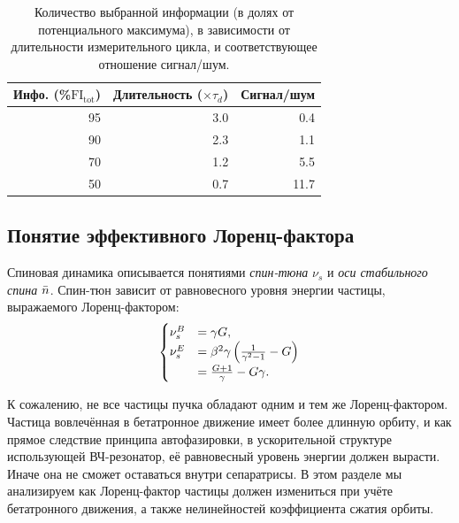 \begin{table}[h]
	\caption{Количество выбранной информации (в долях от потенциального максимума), в зависимости от длительности измерительного цикла, и соответствующее отношение сигнал/шум.\label{tbl:FItot}}
	
	\centering
	\begin{tabular}{rrr}
		\toprule
		Инфо. (\%$\mathrm{FI_{tot}}$) & Длительность ($\times\tau_d$) & Сигнал/шум  \\
		\midrule
		95            & 3.0                     & 0.4         \\
		90            & 2.3                     & 1.1         \\
		70            & 1.2                     & 5.5         \\
		50            & 0.7                     & 11.7        \\
		\bottomrule
	\end{tabular}
\end{table}


\subsection{Понятие эффективного Лоренц-фактора}\label{chpt1:FS-methods:effective-Lorentz-factor}
Спиновая динамика описывается понятиями \emph{спин-тюна} $\nu_s$ и \emph{оси стабильного спина} $\bar n$.
Спин-тюн зависит от равновесного уровня энергии частицы, выражаемого Лоренц-фактором:
\begin{equation}\label{eq:spin_tune_vs_gamma}
\begin{cases}
\nu_s^B &= \gamma G, \\
\nu_s^E &= \beta^2\gamma\bkt{\frac{1}{\gamma^2-1} - G} \\
&= \frac{G+1}{\gamma} - G\gamma.
\end{cases}
\end{equation}

К сожалению, не все частицы пучка обладают одним и тем же Лоренц-фактором. Частица вовлечённая в 
бетатронное движение имеет более длинную орбиту, и как прямое следствие принципа автофазировки,
в ускорительной структуре использующей ВЧ-резонатор, её равновесный уровень энергии 
должен вырасти. Иначе она не сможет оставаться внутри сепаратрисы. В этом разделе мы анализируем как Лоренц-фактор частицы должен измениться при учёте бетатронного движения, а также нелинейностей коэффициента сжатия орбиты.

